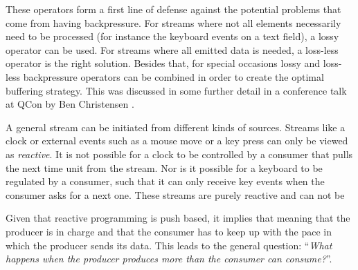 These operators form a first line of defense against the potential problems that come from having backpressure. For streams where not all elements necessarily need to be processed (for instance the keyboard events on a text field), a lossy operator can be used. For streams where all emitted data is needed, a loss-less operator is the right solution. Besides that, for special occasions lossy and loss-less backpressure operators can be combined in order to create the optimal buffering strategy. This was discussed in some further detail in a conference talk at QCon by Ben Christensen .






















\HRule


A general stream can be initiated from different kinds of sources. Streams like a clock or external events such as a mouse move or a key press can only be viewed as \emph{reactive}. It is not possible for a clock to be controlled by a consumer that pulls the next time unit from the stream. Nor is it possible for a keyboard to be regulated by a consumer, such that it can only receive key events when the consumer asks for a next one. These streams are purely reactive and can not be 

Given that reactive programming is push based, it implies that meaning that the producer is in charge and that the consumer has to keep up with the pace in which the producer sends its data. This leads to the general question: ``\emph{What happens when the producer produces more than the consumer can consume?}''. 